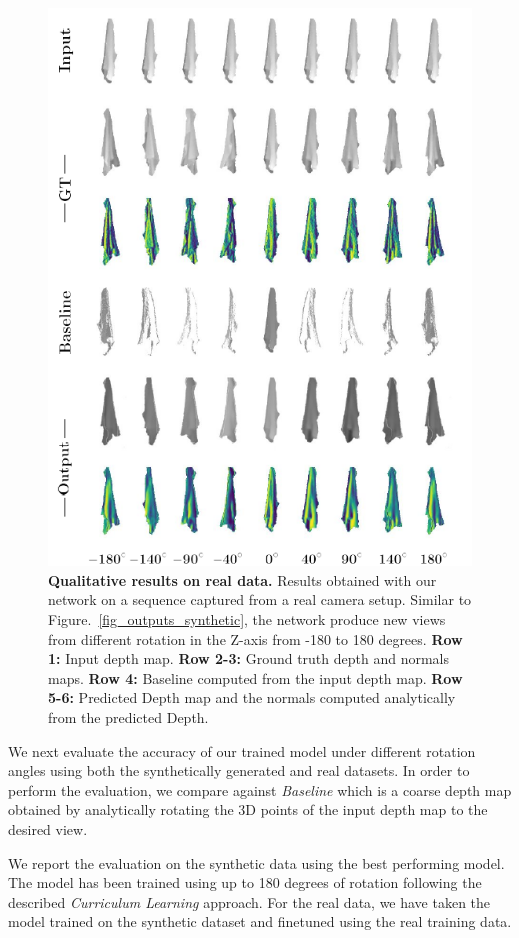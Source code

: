 \begin{figure}
\begin{center}
    \includegraphics[width=0.5\linewidth]{main/chapter04/data/ipalm_cvpr_grid_real_vertical.pdf}
    \caption[Qualitative results on real data]{{\bf Qualitative results on real data.} Results obtained with our network on a sequence captured from a real camera setup. Similar to Figure.~\ref{fig_outputs_synthetic}, the network produce new views from different rotation in the Z-axis from -180 to 180 degrees. \textbf{Row 1:} Input depth map. \textbf{Row 2-3:} Ground truth depth and normals maps. \textbf{Row 4:} Baseline computed from the input depth map. \textbf{Row 5-6:} Predicted Depth map and the normals computed analytically from the predicted Depth.}
    \label{fig_outputs_real}
\end{center}
\end{figure}

We next evaluate the accuracy of our trained model under different rotation angles using both the  synthetically generated and real datasets. In order to perform the evaluation, we compare against {\em Baseline} which is  a coarse depth map obtained by analytically rotating the 3D points of the input depth map to the desired view.

We report the evaluation on the synthetic data using the best performing model. The model has been trained using up to  180 degrees of rotation following the described \textit{Curriculum Learning} approach. For the real data, we have taken the model trained on the synthetic dataset and finetuned using the real training data.

\newcommand{\bgt}{\bD_{\textrm{GT}}}
\newcommand{\bdcoarse}{\bD_{\textrm{coarse}}}

